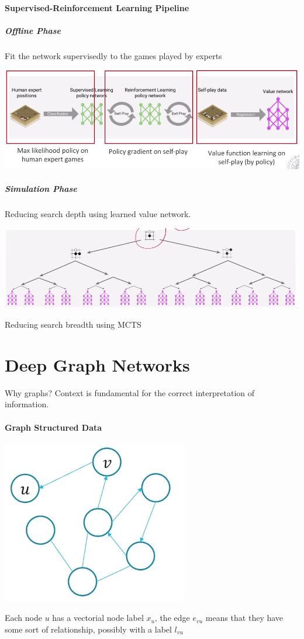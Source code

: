 \documentclass[10pt]{report}
\begin{document}
\paragraph{Supervised-Reinforcement Learning Pipeline}
\subparagraph{Offline Phase} Fit the network supervisedly to the games played by experts
\begin{center}
	\includegraphics[scale=0.5]{188.png}
\end{center}
\subparagraph{Simulation Phase} Reducing search depth using learned value network.
\begin{center}
	\includegraphics[scale=0.5]{189.png}
\end{center}
Reducing search breadth using MCTS %
\section{Deep Graph Networks}
Why graphs? Context is fundamental for the correct interpretation of information.
\paragraph{Graph Structured Data}
\begin{center}
	\includegraphics[scale=0.5]{191.png}
\end{center}
Each node $u$ has a vectorial node label $x_u$, the edge $e_{vu}$ means that they have some sort of relationship, possibly with a label $l_{vu}$
\end{document}
